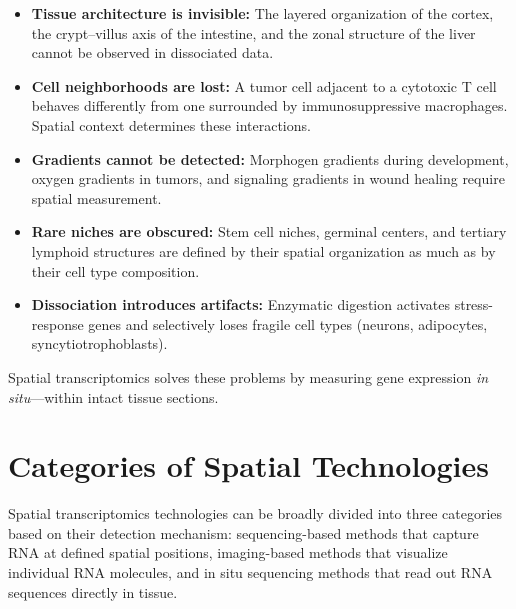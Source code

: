 \begin{itemize}[nosep]
  \item \textbf{Tissue architecture is invisible:} The layered organization of
    the cortex, the crypt--villus axis of the intestine, and the zonal
    structure of the liver cannot be observed in dissociated data.
  \item \textbf{Cell neighborhoods are lost:} A tumor cell adjacent to a
    cytotoxic T cell behaves differently from one surrounded by
    immunosuppressive macrophages. Spatial context determines these
    interactions.
  \item \textbf{Gradients cannot be detected:} Morphogen gradients during
    development, oxygen gradients in tumors, and signaling gradients in wound
    healing require spatial measurement.
  \item \textbf{Rare niches are obscured:} Stem cell niches, germinal centers,
    and tertiary lymphoid structures are defined by their spatial organization
    as much as by their cell type composition.
  \item \textbf{Dissociation introduces artifacts:} Enzymatic digestion
    activates stress-response genes and selectively loses fragile cell types
    (neurons, adipocytes, syncytiotrophoblasts).
\end{itemize}

Spatial transcriptomics solves these problems by measuring gene expression
\emph{in situ}---within intact tissue sections.


\section{Categories of Spatial Technologies}
\label{sec:spatial:categories}

Spatial transcriptomics technologies can be broadly divided into three
categories based on their detection mechanism: sequencing-based methods that
capture RNA at defined spatial positions, imaging-based methods that visualize
individual RNA molecules, and in situ sequencing methods that read out RNA
sequences directly in tissue.

